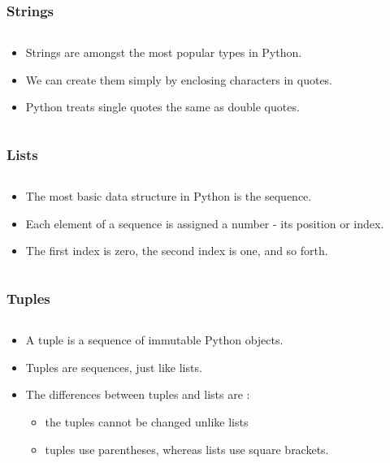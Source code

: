 \documentclass{beamer}
\begin{document}
\begin{frame}
	\frametitle{Strings}
	\begin{columns}[c]
		\begin{column}{30cm}
			\vspace{.1cm}
			\begin{itemize}
				\justifying
				\item Strings are amongst the most popular types in Python.
				\item We can create them simply by enclosing characters in quotes.
				\item Python treats single quotes the same as double quotes.
			\end{itemize}
		\end{column}
	\end{columns}
\end{frame}

\begin{frame}
	\frametitle{Lists}
	\begin{columns}[c]
		\begin{column}{30cm}
			\vspace{.1cm}
			\begin{itemize}
				\justifying
				\item The most basic data structure in Python is the sequence.
				\item Each element of a sequence is assigned a number - its position or index.
				\item The first index is zero, the second index is one, and so forth.
			\end{itemize}
		\end{column}
	\end{columns}
\end{frame}

\begin{frame}
	\frametitle{Tuples}
	\begin{columns}[c]
		\begin{column}{30cm}
			\vspace{.1cm}
			\begin{itemize}
				\justifying
				\item A tuple is a sequence of immutable Python objects.
				\item Tuples are sequences, just like lists.
				\item The differences between tuples and lists are :
				\begin{itemize}
						\item the tuples cannot be changed unlike lists
						\item tuples use parentheses, whereas lists use square brackets.
				\end{itemize}
			\end{itemize}
		\end{column}
	\end{columns}
\end{frame}
\end{document}
